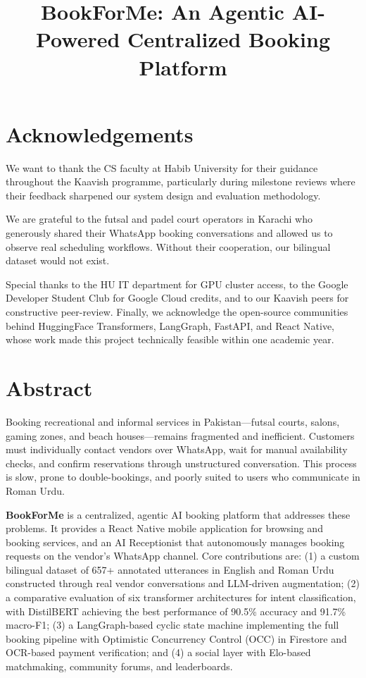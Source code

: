 \documentclass[12pt,oneside]{report}
\title{BookForMe: An Agentic AI-Powered Centralized Booking Platform}
\begin{document}


\chapter*{Acknowledgements}
We want to thank the CS faculty at Habib University for their guidance throughout
the Kaavish programme, particularly during milestone reviews where their feedback
sharpened our system design and evaluation methodology.

We are grateful to the futsal and padel court operators in Karachi who generously
shared their WhatsApp booking conversations and allowed us to observe real scheduling
workflows.  Without their cooperation, our bilingual dataset would not exist.

Special thanks to the HU IT department for GPU cluster access, to the Google
Developer Student Club for Google Cloud credits, and to our Kaavish peers for
constructive peer-review.  Finally, we acknowledge the open-source communities
behind HuggingFace Transformers, LangGraph, FastAPI, and React Native, whose work
made this project technically feasible within one academic year.

\chapter*{Abstract}
Booking recreational and informal services in Pakistan---futsal courts, salons,
gaming zones, and beach houses---remains fragmented and inefficient.  Customers must
individually contact vendors over WhatsApp, wait for manual availability checks, and
confirm reservations through unstructured conversation.  This process is slow, prone
to double-bookings, and poorly suited to users who communicate in Roman Urdu.

\textbf{BookForMe} is a centralized, agentic AI booking platform that addresses
these problems.  It provides a React Native mobile application for browsing and
booking services, and an AI Receptionist that autonomously manages booking requests
on the vendor's WhatsApp channel.  Core contributions are: (1) a custom bilingual
dataset of 657+ annotated utterances in English and Roman Urdu constructed through
real vendor conversations and LLM-driven augmentation; (2) a comparative evaluation
of six transformer architectures for intent classification, with DistilBERT achieving
the best performance of 90.5\% accuracy and 91.7\% macro-F1; (3) a LangGraph-based
cyclic state machine implementing the full booking pipeline with Optimistic
Concurrency Control (OCC) in Firestore and OCR-based payment verification; and (4) a
social layer with Elo-based matchmaking, community forums, and leaderboards.
\end{document}
